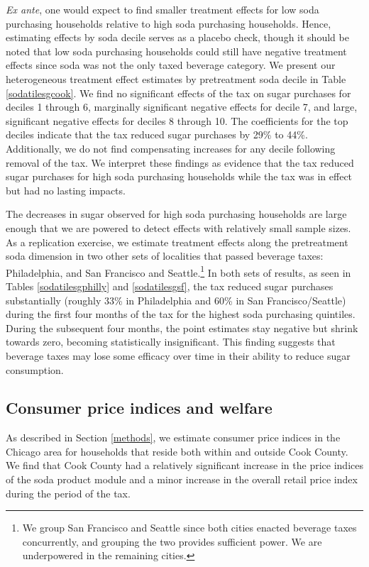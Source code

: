 \documentclass[12pt]{article}
\begin{document}
\textit{Ex ante}, one would expect to find smaller treatment effects for low soda purchasing households relative to high soda purchasing households. Hence, estimating effects by soda decile serves as a placebo check, though it should be noted that low soda purchasing households could still have negative treatment effects since soda was not the only taxed beverage category. We present our heterogeneous treatment effect estimates by pretreatment soda decile in Table \ref{sodatilesgcook}. We find no significant effects of the tax on sugar purchases for deciles 1 through 6, marginally significant negative effects for decile 7, and large, significant negative effects for deciles 8 through 10. The coefficients for the top deciles indicate that the tax reduced sugar purchases by 29\% to 44\%. Additionally, we do not find compensating increases for any decile following removal of the tax. We interpret these findings as evidence that the tax reduced sugar purchases for high soda purchasing households while the tax was in effect but had no lasting impacts.

The decreases in sugar observed for high soda purchasing households are large enough that we are powered to detect effects with relatively small sample sizes. As a replication exercise, we estimate treatment effects along the pretreatment soda dimension in two other sets of localities that passed beverage taxes: Philadelphia, and San Francisco and Seattle.\footnote{We group San Francisco and Seattle since both cities enacted beverage taxes concurrently, and grouping the two provides sufficient power. We are underpowered in the remaining cities.} In both sets of results, as seen in Tables \ref{sodatilesgphilly} and \ref{sodatilesgsf}, the tax reduced sugar purchases substantially (roughly 33\% in Philadelphia and 60\% in San Francisco/Seattle) during the first four months of the tax for the highest soda purchasing quintiles. During the subsequent four months, the point estimates stay negative but shrink towards zero, becoming statistically insignificant. This finding suggests that beverage taxes may lose some efficacy over time in their ability to reduce sugar consumption.

\subsection{Consumer price indices and welfare}

As described in Section \ref{methods}, we estimate consumer price indices in the Chicago area for households that reside both within and outside Cook County. We find that Cook County had a relatively significant increase in the price indices of the soda product module and a minor increase in the overall retail price index during the period of the tax.
\end{document}
